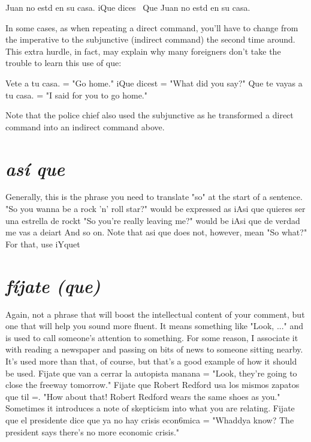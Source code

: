 \documentclass[14pt,a4paper,oneside]{memoir}
\newcommand{\bsk}{\vspace{20pt}}
\begin{document}
\bsk

Juan no estd en su casa.
iQue dices~
Que Juan no estd en su casa.

\bsk

In some cases, as when repeating a direct command, you'll have to
change from the imperative to the subjunctive (indirect command) the
second time around. This extra hurdle, in fact, may explain why many
foreigners don't take the trouble to learn this use of que:

\bsk

Vete a tu casa. = "Go home."
iQue dicest = "What did you say?"
Que te vayas a tu casa. = "I said for you to go home."

\bsk

Note that the police chief also used the subjunctive as he transformed
a direct command into an indirect command above.

\section{\emph{así que}}

Generally, this is the phrase you need to translate "so" at the
start of a sentence. "So you wanna be a rock 'n' roll star?" would be
expressed as iAsi que quieres ser una estrella de rockt "So you're
really leaving me?" would be iAsi que de verdad me vas a deiart And
so on. Note that asi que does not, however, mean "So what?" For that,
use iYquet

\section{\emph{fíjate (que)}}

Again, not a phrase that will boost the intellectual content of
your comment, but one that will help you sound more fluent. It means
something like "Look, ..." and is used to call someone's attention to
something. For some reason, I associate it with reading a newspaper
and passing on bits of news to someone sitting nearby. It's used more
than that, of course, but that's a good example of how it should be
used. Fijate que van a cerrar la autopista manana = "Look, they're
going to close the freeway tomorrow." Fijate que Robert Redford usa
los mismos zapatos que til =. "How about that! Robert Redford wears
the same shoes as you." Sometimes it introduces a note of skepticism
into what you are relating. Fijate que el presidente dice que ya no hay
crisis econ6mica = "Whaddya know? The president says there's no
more economic crisis."
\end{document}
